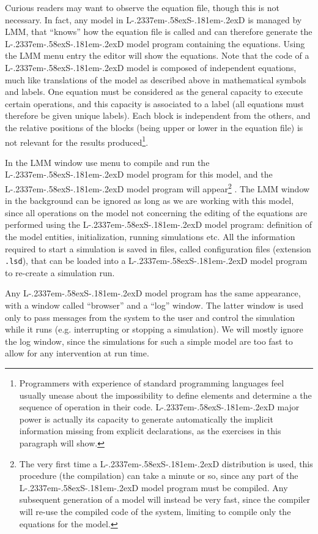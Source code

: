 \documentclass [11pt,a4paper] {book}
\def\LsD{{L\kern-.2337em\lower-.58ex\hbox{S}\kern-.181em\lower-.2ex\hbox{D}}\xspace}
\begin{document}
Curious readers may want to observe the equation file, though this is not necessary. In fact, any model in \LsD is managed by LMM, that ``knows'' how the equation file is called and can therefore generate the \LsD model program containing the equations. Using the LMM menu entry  the editor will show the equations. Note that the code of a \LsD model is composed of independent equations, much like translations of the model as described above in mathematical symbols and labels. One equation must be considered as the general capacity to execute certain operations, and this capacity is associated to a label (all equations must therefore be given unique labels). Each block is independent from the others, and the relative positions of the blocks (being upper or lower in the equation file) is not relevant for the results produced\footnote{Programmers with experience of standard programming languages feel usually unease about the impossibility to define elements and determine a the sequence of operation in their code. \LsD major power is actually its capacity to generate automatically the implicit information missing from explicit declarations, as the exercises in this paragraph will show.}.

In the LMM window use menu  to compile and run the \LsD model program for this model, and the \LsD model program will appear\footnote{The very first time a \LsD distribution is used, this procedure (the compilation) can take a minute or so, since any part of the \LsD model program must be compiled. Any subsequent generation of a model will instead be very fast, since the compiler will re-use the compiled code of the system, limiting to compile only the equations for the model.} . The LMM window in the background can be ignored as long as we are working with this model, since all operations on the model not concerning the editing of the equations are performed using the \LsD model program: definition of the model entities, initialization, running simulations etc. All the information required to start a simulation is saved in files, called configuration files (extension \texttt{.lsd}), that can be loaded into a \LsD model program to re-create a simulation run.

Any \LsD model program has the same appearance, with a window called ``browser'' and a ``log'' window. The latter window is used only to pass messages from the system to the user and control the simulation while it runs (e.g. interrupting or stopping a simulation). We will mostly ignore the log window, since the simulations for such a simple model are too fast to allow for any intervention at run time.
\end{document}

